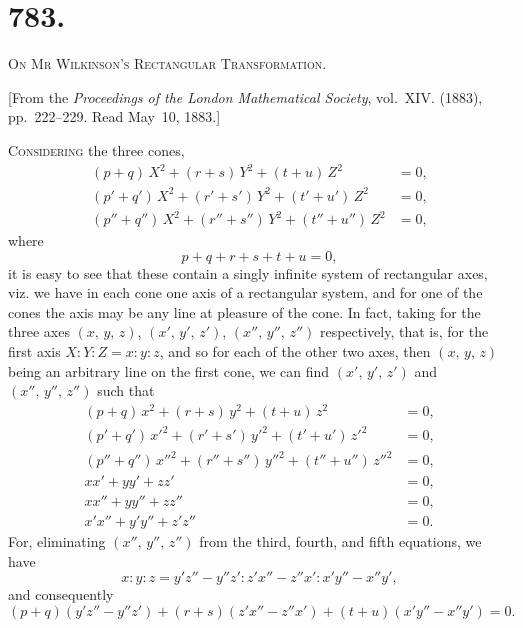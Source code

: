 \documentclass[11pt,a4paper]{book}
\begin{document}
\newpage

\section*{783.}

\begin{center}
\Large\scshape On Mr Wilkinson's Rectangular Transformation.
\end{center}

\begin{center}
[From the \textit{Proceedings of the London Mathematical Society}, vol.~XIV. (1883), pp.~222--229. Read May~10, 1883.]
\end{center}

\textsc{Considering} the three cones,
\begin{align*}
(p+q)\,X^{2} + (r+s)\,Y^{2} + (t+u)\,Z^{2} &= 0,\\
(p'+q')\,X^{2} + (r'+s')\,Y^{2} + (t'+u')\,Z^{2} &= 0,\\
(p''+q'')\,X^{2} + (r''+s'')\,Y^{2} + (t''+u'')\,Z^{2} &= 0,
\end{align*}
where
\[
p+q+r+s+t+u = 0,
\]
it is easy to see that these contain a singly infinite system of rectangular axes, viz. we have in each cone one axis of a rectangular system, and for one of the cones the axis may be any line at pleasure of the cone. In fact, taking for the three axes $(x,\, y,\, z)$, $(x',\, y',\, z')$, $(x'',\, y'',\, z'')$ respectively, that is, for the first axis $X : Y : Z = x : y : z$, and so for each of the other two axes, then $(x,\, y,\, z)$ being an arbitrary line on the first cone, we can find $(x',\, y',\, z')$ and $(x'',\, y'',\, z'')$ such that
\begin{align*}
(p+q)\,x^{2} + (r+s)\,y^{2} + (t+u)\,z^{2} &= 0,\\
(p'+q')\,x'^{2} + (r'+s')\,y'^{2} + (t'+u')\,z'^{2} &= 0,\\
(p''+q'')\,x''^{2} + (r''+s'')\,y''^{2} + (t''+u'')\,z''^{2} &= 0,\\
xx' + yy' + zz' &= 0,\\
xx'' + yy'' + zz'' &= 0,\\
x'x'' + y'y'' + z'z'' &= 0.
\end{align*}
For, eliminating $(x'',\, y'',\, z'')$ from the third, fourth, and fifth equations, we have
\[
x : y : z = y'z'' - y''z' : z'x'' - z''x' : x'y'' - x''y',
\]
and consequently
\[
(p+q)(y'z'' - y''z') + (r+s)(z'x'' - z''x') + (t+u)(x'y'' - x''y') = 0.
\]
\end{document}
